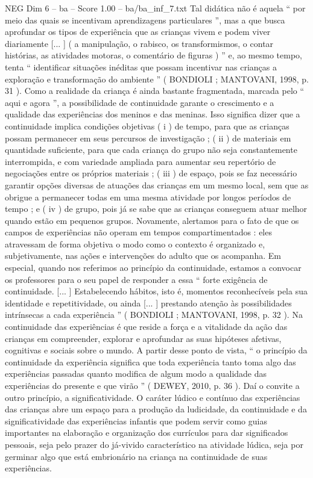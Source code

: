 \begin{textsample}{NEG Dim 6 – ba – Score 1.00 – ba/ba\_inf\_7.txt}
Tal didática não é aquela “ por meio das quais se incentivam aprendizagens particulares ”, mas a que busca aprofundar os tipos de experiência que as crianças vivem e podem viver diariamente [... ] ( a manipulação, o rabisco, os transformismos, o contar histórias, as atividades motoras, o comentário de figuras ) ” e, ao mesmo tempo, tenta “ identificar situações inéditas que possam incentivar nas crianças a exploração e transformação do ambiente ” ( BONDIOLI ; MANTOVANI, 1998, p. 31 ).
Como a realidade da criança é ainda bastante fragmentada, marcada pelo “ aqui e agora ”, a possibilidade de continuidade garante o crescimento e a qualidade das experiências dos meninos e das meninas.
Isso significa dizer que a continuidade implica condições objetivas ( i ) de tempo, para que as crianças possam permanecer em seus percursos de investigação ; ( ii ) de materiais em quantidade suficiente, para que cada criança do grupo não seja constantemente interrompida, e com variedade ampliada para aumentar seu repertório de negociações entre os próprios materiais ; ( iii ) de espaço, pois se faz necessário garantir opções diversas de atuações das crianças em um mesmo local, sem que as obrigue a permanecer todas em uma mesma atividade por longos períodos de tempo ; e ( iv ) de grupo, pois já se sabe que as crianças conseguem atuar melhor quando estão em pequenos grupos.
Novamente, alertamos para o fato de que os campos de experiências não operam em tempos compartimentados : eles atravessam de forma objetiva o modo como o contexto é organizado e, subjetivamente, nas ações e intervenções do adulto que os acompanha.
Em especial, quando nos referimos ao princípio da continuidade, estamos a convocar os professores para o seu papel de responder a essa “ forte exigência de continuidade. [... ] Estabelecendo hábitos, isto é, momentos reconhecíveis pela sua identidade e repetitividade, ou ainda [... ] prestando atenção às possibilidades intrínsecas a cada experiência ” ( BONDIOLI ; MANTOVANI, 1998, p. 32 ).
Na continuidade das experiências é que reside a força e a vitalidade da ação das crianças em compreender, explorar e aprofundar as suas hipóteses afetivas, cognitivas e sociais sobre o mundo.
A partir desse ponto de vista, “ o princípio da continuidade da experiência significa que toda experiência tanto toma algo das experiências passadas quanto modifica de algum modo a qualidade das experiências do presente e que virão ” ( DEWEY, 2010, p. 36 ).
Daí o convite a outro princípio, a significatividade.
O caráter lúdico e contínuo das experiências das crianças abre um espaço para a produção da ludicidade, da continuidade e da significatividade das experiências infantis que podem servir como guias importantes na elaboração e organização dos currículos para dar significados pessoais, seja pelo prazer do já-vivido característico na atividade lúdica, seja por germinar algo que está embrionário na criança na continuidade de suas experiências.

\end{textsample}
